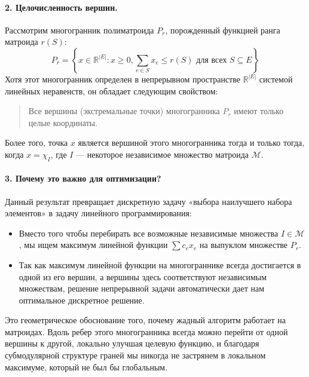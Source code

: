 \paragraph{2. Целочисленность вершин.}
Рассмотрим многогранник полиматроида $P_r$, порожденный функцией ранга матроида $r(S)$:
\[ P_r = \left\{ x \in \mathbb{R}^{|E|} : x \geq 0, \sum_{e \in S} x_e \leq r(S) \text{ для всех } S \subseteq E \right\} \]
Хотя этот многогранник определен в непрерывном пространстве $\mathbb{R}^{|E|}$ системой линейных неравенств, он обладает следующим свойством:
\begin{quote}
    Все вершины (экстремальные точки) многогранника $P_r$ имеют только целые координаты.
\end{quote}
Более того, точка $x$ является вершиной этого многогранника тогда и только тогда, когда $x = \chi_I$, где $I$ — некоторое независимое множество матроида $\mathcal{M}$.

\paragraph{3. Почему это важно для оптимизации?}
Данный результат превращает дискретную задачу «выбора наилучшего набора элементов» в задачу линейного программирования:
\begin{itemize}
    \item Вместо того чтобы перебирать все возможные независимые множества $I \in \mathcal{M}$, мы ищем максимум линейной функции $\sum c_e x_e$ на выпуклом множестве $P_r$.
    \item Так как максимум линейной функции на многограннике всегда достигается в одной из его вершин, а вершины здесь соответствуют независимым множествам, решение непрерывной задачи автоматически дает нам оптимальное дискретное решение.
\end{itemize}
 
Это геометрическое обоснование того, почему жадный алгоритм работает на матроидах. Вдоль ребер этого многогранника всегда можно перейти от одной вершины к другой, локально улучшая целевую функцию, и благодаря субмодулярной структуре граней мы никогда не застрянем в локальном максимуме, который не был бы глобальным.

